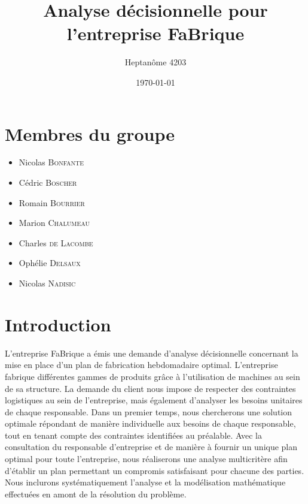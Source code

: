 \documentclass[a4paper,10pt]{article}
\title{Analyse décisionnelle pour l'entreprise FaBrique}
\author{Heptanôme 4203}
\date{\today}
\begin{document}
\maketitle 


\section*{Membres du groupe}
\begin{itemize}
\item Nicolas \textsc{Bonfante}
\item Cédric \textsc{Boscher}
\item Romain \textsc{Bourrier}
\item Marion \textsc{Chalumeau}
\item Charles \textsc{de Lacombe}
\item Ophélie \textsc{Delsaux}
\item Nicolas \textsc{Nadisic}
\end{itemize}

\section*{Introduction}

  L'entreprise FaBrique a émis une demande d'analyse décisionnelle concernant la mise en place d'un plan de fabrication hebdomadaire optimal. L'entreprise fabrique différentes gammes de produits grâce à l'utilisation de machines au sein de sa structure. La demande du client nous impose de respecter des contraintes logistiques au sein de l'entreprise, mais également d'analyser les besoins unitaires de chaque responsable. Dans un premier temps, nous chercherons une solution optimale répondant de manière individuelle aux besoins de chaque responsable, tout en tenant compte des contraintes identifiées au préalable. Avec la consultation du responsable d'entreprise et de manière à fournir un unique plan optimal pour toute l'entreprise, nous réaliserons une analyse multicritère afin d'établir un plan permettant un compromis satisfaisant pour chacune des parties. Nous inclurons systématiquement l'analyse et la modélisation mathématique effectuées en amont de la résolution du problème.
  
\newpage
\tableofcontents

\newpage
\end{document}
